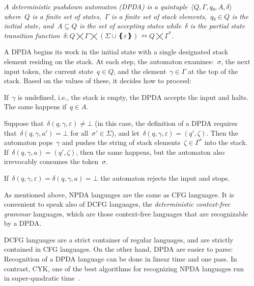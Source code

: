 \begin{Definition}
  \label{Definition:DPDA}
  \slshape
  A \emph{deterministic pushdown automaton} (DPDA) is a quintuple~$⟨Q,Γ,q₀,A,δ⟩$
  where~$Q$ is a finite set of
    \emph{states},~$Γ$ is a finite
  \emph{set of stack elements},~$q₀∈Q$ is the initial state,
  and~$A⊆Q$ is the \emph{set of accepting states} while~$δ$ is
  the \emph{partial state transition function}~$δ:Q⨉Γ⨉(Σ∪❴ε❵)↛Q⨉Γ^*$.
  \par
  A DPDA begins its work in the initial state with a single designated stack element residing on the stack. 
  At each step, the automaton examines:~$σ$, the next input token, the current state~$q∈Q$, and the element~$γ∈Γ$ at the top of the stack. Based on the values of these, it decides how to proceed:
  \par
  If~$γ$ is undefined, i.e., the stack is empty, the DPDA accepts the input and halts.
  The same happens if~$q∈A$.
  \par
  Suppose that~$δ(q,γ,ε)≠⊥$ (in this case, the definition of a DPDA requires that~$δ(q,γ,a')=⊥$ for all~$σ'∈Σ$),
  and let~$δ(q,γ,ε)=(q',ζ)$.
  Then the automaton pops~$γ$
  and pushes the string of stack elements~$ζ∈Γ^*$ into the stack.
  If~$δ(q,γ,a)=(q',ζ)$, then the same happens, but the
  automaton also irrevocably consumes the token~$σ$.
  \par
  If~$δ(q,γ,ε)=δ(q,γ,a)=⊥$ the automaton rejects the input and stops.
\end{Definition}

As mentioned above, NPDA languages are the same as CFG languages.
It is convenient to speak also of DCFG languages, the \emph{deterministic context-free grammar} languages,
which are those context-free languages that are recognizable by a DPDA.

DCFG languages are a strict container of regular languages,
  and are strictly contained in CFG languages.
On the other hand, DPDA are easier to parse:
  Recognition of a DPDA language
  can be done in linear time and one pass.
  In contrast, CYK, one of the best algorithms for recognizing NPDA languages run in super-quadratic time~\cite{Younger:1967,Cocke:1969,Earley:1970}.

